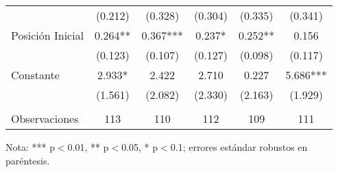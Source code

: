 \begin{table}[ht!]
\begin{threeparttable}
{\begin{tabular}{lccccc}
    	                                        &	(0.212)	&	(0.328)	&	(0.304)	&	(0.335)	        &	(0.341)	            \\
    Posición Inicial	                        &	0.264**	& 0.367***	&	0.237*	&	0.252**	        &	0.156           	\\
    	                                        &	(0.123)	&	(0.107)	&	(0.127)	&	(0.098)	        &	(0.117)	            \\
    Constante	                                &	2.933*	&	2.422	&	2.710	&	0.227	        &	5.686***        	\\
    	                                        &	(1.561)	&	(2.082)	&	(2.330)	&	(2.163)	        &	(1.929)	            \\
    	                                        &		    &		    &		    &		            &		                \\
    Observaciones	                            &	113	    &	110	    &	112	    &	109	            &	111	                \\\hline \hline
    \end{tabular}}
    \begin{tablenotes}
    \scriptsize{
    \item Nota: *** p$<$0.01, ** p$<$0.05, * p$<$0.1; errores estándar robustos en paréntesis.}
    \end{tablenotes}
    \end{threeparttable}
\end{table}